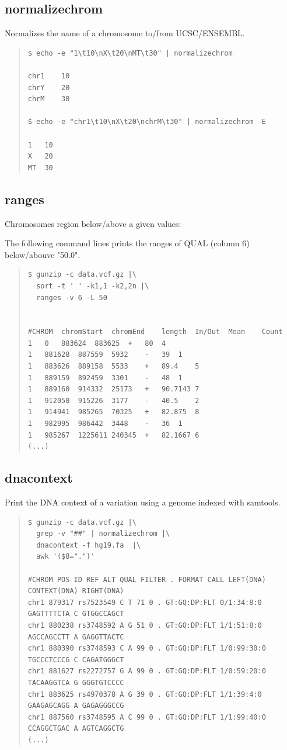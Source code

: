 \documentclass[12pt]{article}
\begin{document}
\subsection{normalizechrom}
Normalizes the name of a chromosome to/from UCSC/ENSEMBL.

\begin{quote}
\begin{verbatim}
$ echo -e "1\t10\nX\t20\nMT\t30" | normalizechrom 

chr1	10
chrY	20
chrM	30

$ echo -e "chr1\t10\nX\t20\nchrM\t30" | normalizechrom -E

1	10
X	20
MT	30
\end{verbatim}
\end{quote}

\subsection{ranges}
Chromosomes region below/above a given values:

The following command lines prints the ranges of QUAL (column 6) below/abouve "50.0".

\begin{quote}
\begin{verbatim}
$ gunzip -c data.vcf.gz |\
  sort -t ' ' -k1,1 -k2,2n |\
  ranges -v 6 -L 50 


#CHROM	chromStart	chromEnd	length	In/Out	Mean	Count
1	0	883624	883625	+	80	4
1	881628	887559	5932	-	39	1
1	883626	889158	5533	+	89.4	5
1	889159	892459	3301	-	48	1
1	889160	914332	25173	+	90.7143	7
1	912050	915226	3177	-	40.5	2
1	914941	985265	70325	+	82.875	8
1	982995	986442	3448	-	36	1
1	985267	1225611	240345	+	82.1667	6
(...)
\end{verbatim}
\end{quote}

\subsection{dnacontext}
Print the DNA context of a variation using a genome indexed with samtools.
\begin{quote}
\begin{verbatim}
$ gunzip -c data.vcf.gz |\
  grep -v "##" | normalizechrom |\
  dnacontext -f hg19.fa  |\
  awk '($8=".")'

#CHROM POS ID REF ALT QUAL FILTER . FORMAT CALL LEFT(DNA) CONTEXT(DNA) RIGHT(DNA)
chr1 879317 rs7523549 C T 71 0 . GT:GQ:DP:FLT 0/1:34:8:0 GAGTTTTCTA C GTGGCCAGCT
chr1 880238 rs3748592 A G 51 0 . GT:GQ:DP:FLT 1/1:51:8:0 AGCCAGCCTT A GAGGTTACTC
chr1 880390 rs3748593 C A 99 0 . GT:GQ:DP:FLT 1/0:99:30:0 TGCCCTCCCG C CAGATGGGCT
chr1 881627 rs2272757 G A 99 0 . GT:GQ:DP:FLT 1/0:59:20:0 TACAAGGTCA G GGGTGTCCCC
chr1 883625 rs4970378 A G 39 0 . GT:GQ:DP:FLT 1/1:39:4:0 GAAGAGCAGG A GAGAGGGCCG
chr1 887560 rs3748595 A C 99 0 . GT:GQ:DP:FLT 1/1:99:40:0 CCAGGCTGAC A AGTCAGGCTG
(...)
\end{verbatim}
\end{quote}
\end{document}
